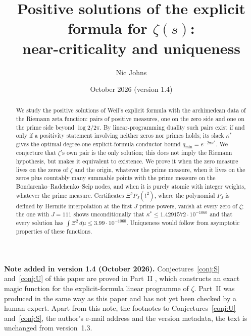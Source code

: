 \documentclass[11pt]{amsart}
\title[Positive solutions of the explicit formula]{Positive solutions of the explicit formula for $\zeta(s)$:\\ near-criticality and uniqueness}
\author{Nic Johns}
\date{October 2026 (version 1.4)}
\theoremstyle{definition}
\theoremstyle{remark}
\numberwithin{equation}{section}
\newcommand{\inputsection}[1]{}
\begin{document}
\begin{abstract}
We study the positive solutions of Weil's explicit formula with the archimedean data of the Riemann zeta function:
pairs of positive measures, one on the zero side and one on the prime side beyond $\log2/2\pi$. By linear-programming
duality such pairs exist if and only if a positivity statement involving neither zeros nor primes holds; its slack
$\kappa^*$ gives the optimal degree-one explicit-formula conductor bound $q_{\min}=e^{-2\pi\kappa^*}$. We conjecture that $\zeta$'s
own pair is the only solution; this does not imply the Riemann hypothesis, but makes it equivalent to existence. We
prove it when the zero measure lives on the zeros of $\zeta$ and the origin, whatever the prime measure, when it lives
on the zeros plus countably many summable points with the prime measure on the Bondarenko--Radchenko--Seip nodes, and when it is purely
atomic with integer weights, whatever the prime measure. Certificates
$\Xi^2P_J(t^2)$, where the polynomial $P_J$ is defined by Hermite interpolation at the first $J$ prime powers, vanish at every zero of
$\zeta$; the one with $J=111$ shows unconditionally that $\kappa^*\le1.4291572\cdot10^{-1060}$ and that every
solution has $\int\Xi^2\,d\mu\le3.99\cdot10^{-1060}$. Uniqueness would follow from asymptotic properties of these functions.
\end{abstract}

\maketitle

\noindent\textbf{Note added in version 1.4 (October 2026).} Conjectures~\ref{conj:S} and~\ref{conj:U} of this paper are proved in
Part~II \cite{PartII}, which constructs an exact magic function for the explicit-formula linear programme of $\zeta$. Part~II was
produced in the same way as this paper and has not yet been checked by a human expert. Apart from this note, the footnotes to
Conjectures~\ref{conj:U} and~\ref{conj:S}, the author's e-mail address and the version metadata, the text is unchanged from
version~1.3.

\setcounter{tocdepth}{1}
\tableofcontents

\inputsection{01-intro}
\inputsection{02-setting}
\inputsection{03-uniqueness}
\inputsection{04-family}
\inputsection{05-certified}
\inputsection{06-conjectures}
\end{document}
